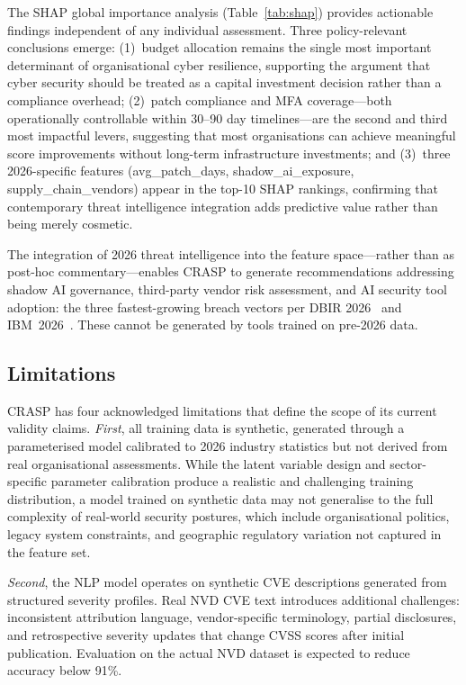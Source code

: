 \documentclass[journal]{IEEEtran}
\begin{document}
The SHAP global importance analysis (Table~\ref{tab:shap}) provides
actionable findings independent of any individual assessment. Three
policy-relevant conclusions emerge: (1)~budget allocation remains the
single most important determinant of organisational cyber resilience,
supporting the argument that cyber security should be treated as a capital
investment decision rather than a compliance overhead; (2)~patch compliance
and MFA coverage---both operationally controllable within 30--90 day
timelines---are the second and third most impactful levers, suggesting
that most organisations can achieve meaningful score improvements without
long-term infrastructure investments; and (3)~three 2026-specific features
(avg\_patch\_days, shadow\_ai\_exposure, supply\_chain\_vendors) appear in
the top-10 SHAP rankings, confirming that contemporary threat intelligence
integration adds predictive value rather than being merely cosmetic.

The integration of 2026 threat intelligence into the feature space---rather
than as post-hoc commentary---enables CRASP to generate recommendations
addressing shadow AI governance, third-party vendor risk assessment, and AI
security tool adoption: the three fastest-growing breach vectors per DBIR
2026~\cite{verizon2026} and IBM~2026~\cite{ibm2026}. These cannot be
generated by tools trained on pre-2026 data.

\subsection{Limitations}

CRASP has four acknowledged limitations that define the scope of its current
validity claims. \emph{First}, all training data is synthetic, generated
through a parameterised model calibrated to 2026 industry statistics but
not derived from real organisational assessments. While the latent variable
design and sector-specific parameter calibration produce a realistic and
challenging training distribution, a model trained on synthetic data may
not generalise to the full complexity of real-world security postures,
which include organisational politics, legacy system constraints, and
geographic regulatory variation not captured in the feature set.

\emph{Second}, the NLP model operates on synthetic CVE descriptions
generated from structured severity profiles. Real NVD CVE text introduces
additional challenges: inconsistent attribution language, vendor-specific
terminology, partial disclosures, and retrospective severity updates that
change CVSS scores after initial publication. Evaluation on the actual NVD
dataset is expected to reduce accuracy below 91\%.
\end{document}
